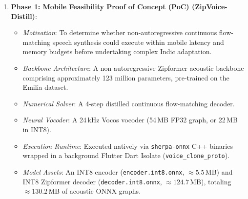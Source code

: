\begin{enumerate}
    \item \textbf{Phase 1: Mobile Feasibility Proof of Concept (PoC) (ZipVoice-Distill)}:
    \begin{itemize}
        \item \textit{Motivation}: To determine whether non-autoregressive continuous flow-matching speech synthesis could execute within mobile latency and memory budgets before undertaking complex Indic adaptation.
        \item \textit{Backbone Architecture}: A non-autoregressive Zipformer acoustic backbone comprising approximately 123 million parameters, pre-trained on the Emilia dataset.
        \item \textit{Numerical Solver}: A 4-step distilled continuous flow-matching decoder.
        \item \textit{Neural Vocoder}: A 24\,kHz Vocos vocoder (54\,MB FP32 graph, or 22\,MB in INT8).
        \item \textit{Execution Runtime}: Executed natively via \texttt{sherpa-onnx} C++ binaries wrapped in a background Flutter Dart Isolate (\texttt{voice\_clone\_proto}).
        \item \textit{Model Assets}: An INT8 encoder (\texttt{encoder.int8.onnx}, $\approx 5.5$\,MB) and INT8 Zipformer decoder (\texttt{decoder.int8.onnx}, $\approx 124.7$\,MB), totaling $\approx 130.2$\,MB of acoustic ONNX graphs.
    \end{itemize}
    

\end{enumerate}
